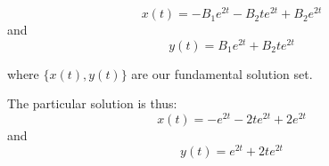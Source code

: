 \documentclass[12pt,a4paper]{article}
\begin{document}
\begin{enumerate}
  
  \begin{equation*}
  x(t)= -B_1e^{2t} -B_2te^{2t} + B_2e^{2t}    
  \end{equation*}
  and
  \begin{equation*}
  y(t)= B_1e^{2t} + B_2te^{2t}    
  \end{equation*}

where $\{ x(t), y(t)  \}$  are our fundamental solution set.

  The particular solution  is thus:
  \begin{equation*}
  x(t)= -e^{2t} -2te^{2t} + 2e^{2t}    
  \end{equation*}
   and
   \begin{equation*}
  y(t)= e^{2t} + 2te^{2t}    
  \end{equation*}
\end{enumerate}
\end{document}
